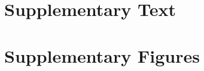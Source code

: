 \documentclass{article} %
\begin{document}
\clearpage
{\small


}

\clearpage
\appendix

\section{Supplementary Text}


\section{Supplementary Figures}

\end{document}
